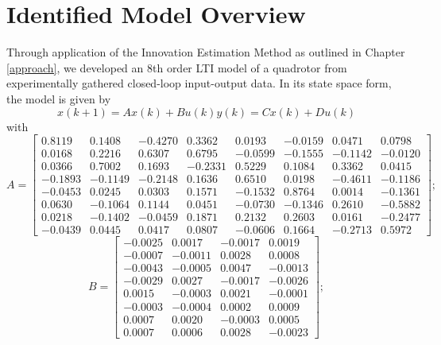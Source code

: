 \section{Identified Model Overview}
Through application of the Innovation Estimation Method as outlined in Chapter \ref{approach}, we developed an 8th order LTI model of a quadrotor from experimentally gathered closed-loop input-output data. In its state space form, the model is given by
\begin{subequations}\label{eq:2_lti}
\begin{equation*}x(k+1) = Ax(k) + Bu(k)\end{equation*}
\begin{equation*}y(k) = Cx(k) + Du(k)\end{equation*}
\end{subequations}
with
\footnotesize %
\begin{equation*}
A = \begin{bmatrix}
0.8119&0.1408&-0.4270&0.3362&0.0193&-0.0159&0.0471&0.0798\\
0.0168&0.2216&0.6307&0.6795&-0.0599&-0.1555&-0.1142&-0.0120\\
0.0366&0.7002&0.1693&-0.2331&0.5229&0.1084&0.3362&0.0415\\
-0.1893&-0.1149&-0.2148&0.1636&0.6510&0.0198&-0.4611&-0.1186\\
-0.0453&0.0245&0.0303&0.1571&-0.1532&0.8764&0.0014&-0.1361\\
0.0630&-0.1064&0.1144&0.0451&-0.0730&-0.1346&0.2610&-0.5882\\
0.0218&-0.1402&-0.0459&0.1871&0.2132&0.2603&0.0161&-0.2477\\
-0.0439&0.0445&0.0417&0.0807&-0.0606&0.1664&-0.2713&0.5972
\end{bmatrix};
\end{equation*}
\begin{equation*}
B = \begin{bmatrix}
   -0.0025&0.0017&-0.0017&0.0019\\
   -0.0007&-0.0011&0.0028&0.0008\\
   -0.0043&-0.0005&0.0047&-0.0013\\
   -0.0029&0.0027&-0.0017&-0.0026\\
    0.0015&-0.0003&0.0021&-0.0001\\
   -0.0003&-0.0004&0.0002&0.0009\\
    0.0007&0.0020&-0.0003&0.0005\\
    0.0007&0.0006&0.0028&-0.0023
\end{bmatrix};
\end{equation*}   
